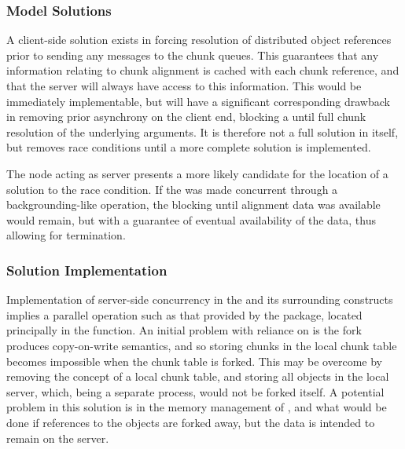 
\subsubsection{Model Solutions}

A client-side solution exists in forcing resolution of distributed object
references prior to sending any messages to the chunk queues.
This guarantees that any information relating to chunk alignment is cached with
each chunk reference, and that the server will always have access to this
information.
This would be immediately implementable, but will have a significant
corresponding drawback in removing prior asynchrony on the client end, blocking
a  until full chunk resolution of the
underlying arguments.
It is therefore not a full solution in itself, but removes race conditions
until a more complete solution is implemented.

The node acting as server presents a more likely candidate for the location of
a solution to the race condition.
If the  was made concurrent through a
backgrounding-like operation, the blocking until alignment data was available
would remain, but with a guarantee of eventual availability of the data, thus
allowing for termination.

\subsubsection{Solution Implementation}

Implementation of server-side concurrency in the
 and its surrounding constructs implies a
parallel operation such as that provided by the  package,
located principally in the  function.
An initial problem with reliance on  is the
fork produces copy-on-write semantics, and so storing chunks in the local chunk
table becomes impossible when the chunk table is forked.
This may be overcome by removing the concept of a local chunk table, and
storing all objects in the local  server, which, being a separate
process, would not be forked itself. 
A potential problem in this solution is in the memory management of
, and what would be done if references to the \R{} objects are forked
away, but the data is intended to remain on the server.

